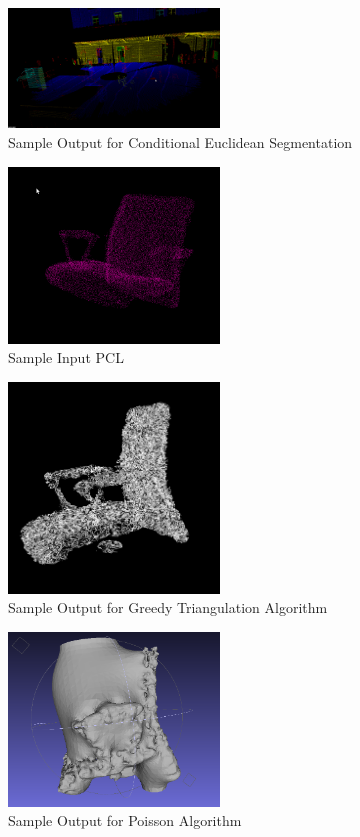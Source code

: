 \begin{figure}[h]
	\includegraphics[width=0.5\textwidth]{./figure/statueAfter.png}
	\caption{Sample Output for Conditional Euclidean Segmentation}
	\label{fig:euclidean output}
\end{figure}

\begin{figure}[h]
	\includegraphics[width=0.5\textwidth]{./figure/pointChair.png}
	\caption{Sample Input PCL}
	\label{fig:Chair Point Cloud}
\end{figure}


\begin{figure}[h]
	\includegraphics[width=0.5\textwidth]{./figure/meshChair.png}
	\caption{Sample Output for Greedy Triangulation Algorithm}
	\label{fig:greedy output}
\end{figure}

\begin{figure}[h]
	\includegraphics[width=0.5\textwidth]{./figure/poissonChair.png}
	\caption{Sample Output for Poisson Algorithm}
	\label{fig:poisson output}
\end{figure}